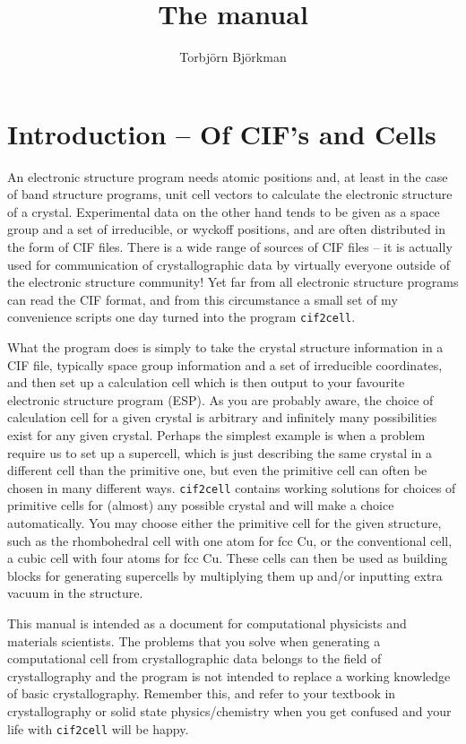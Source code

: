 \documentclass[11pt]{article}
\title{The \ciftocell{} manual}
\author{Torbj\"orn Bj\"orkman}
\newcommand{\ciftocell}{\texttt{cif2cell}}
\begin{document}
\maketitle
\section*{Introduction -- Of CIF's and Cells}
An electronic structure program needs atomic positions and, at least in the case of band structure programs, unit cell vectors to calculate the electronic structure of a crystal. Experimental data on the other hand tends to be given as a space group and a set of irreducible, or wyckoff positions, and are often distributed in the form of CIF files. There is a wide range of sources of CIF files -- it is actually used for communication of crystallographic data by virtually everyone outside of the electronic structure community! Yet far from all electronic structure programs can read the CIF format, and from this circumstance a small set of my convenience scripts one day turned into the program \ciftocell.

What the program does is simply to take the crystal structure information in a CIF file, typically space group information and a set of irreducible coordinates, and then set up a calculation cell which is then output to your favourite electronic structure program (ESP). As you are probably aware, the choice of calculation cell for a given crystal is arbitrary and infinitely many possibilities exist for any given crystal. Perhaps the simplest example is when a problem require us to set up a supercell, which is just describing the same crystal in a different cell than the primitive one, but even the primitive cell can often be chosen in many different ways. \ciftocell{} contains working solutions for choices of primitive cells for (almost) any possible crystal and will make a choice automatically. You may choose either the primitive cell for the given structure, such as the rhombohedral cell with one atom for fcc Cu, or the conventional cell, a cubic cell with four atoms for fcc Cu. These cells can then be used as building blocks for generating supercells by multiplying them up and/or inputting extra vacuum in the structure. 

This manual is intended as a document for computational physicists and materials scientists. The problems that you solve when generating a computational cell from crystallographic data belongs to the field of crystallography and the program is not intended to replace a working knowledge of basic crystallography. Remember this, and refer to your textbook in crystallography or solid state physics/chemistry when you get confused and your life with \ciftocell{} will be happy.
\end{document}
